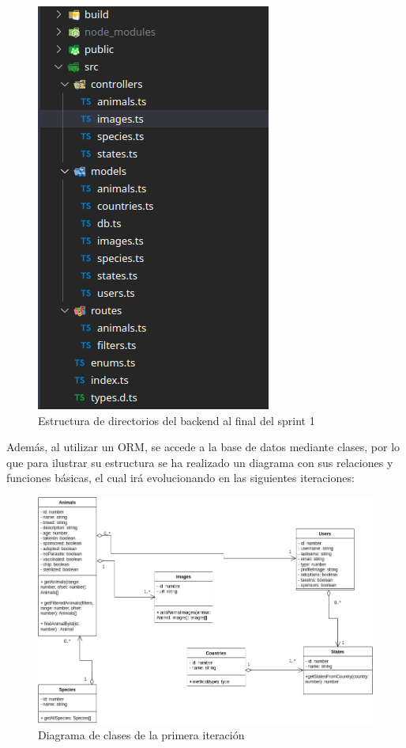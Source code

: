 \begin{figure}[H]
	\centering
	\includegraphics[width=0.7\linewidth]{"sprint 1/directoriosBack"}
	\caption{Estructura de directorios del backend al final del sprint 1}
	\label{fig:directoriosback1}
\end{figure}

Además, al utilizar un ORM, se accede a la base de datos mediante clases, por lo que para ilustrar su estructura se ha realizado un diagrama con sus relaciones y funciones básicas, el cual irá evolucionando en las siguientes iteraciones:

\begin{figure}[H]
	\centering
	\includegraphics[width=1\linewidth]{"sprint 1/clases"}
	\caption{Diagrama de clases de la primera iteración}
	\label{fig:clases}
\end{figure}


